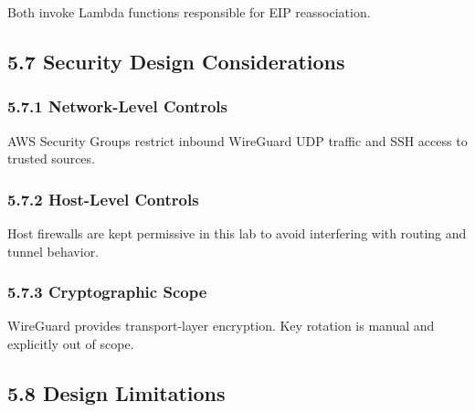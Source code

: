 \documentclass[11pt]{article}
\begin{document}
Both invoke Lambda functions responsible for EIP reassociation.

%
%
\subsection{5.7 Security Design Considerations}
\label{sec:security-design}

\subsubsection{5.7.1 Network-Level Controls}
\label{sec:network-controls}

AWS Security Groups restrict inbound WireGuard UDP traffic and SSH access to trusted sources.

\subsubsection{5.7.2 Host-Level Controls}
\label{sec:host-controls}

Host firewalls are kept permissive in this lab to avoid interfering with routing and tunnel behavior.

\subsubsection{5.7.3 Cryptographic Scope}
\label{sec:crypto-scope}

WireGuard provides transport-layer encryption. Key rotation is manual and explicitly out of scope.

%
%
\subsection{5.8 Design Limitations}
\label{sec:design-limitations}
\end{document}
